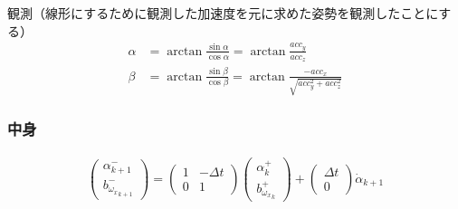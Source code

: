 観測（線形にするために観測した加速度を元に求めた姿勢を観測したことにする）
\begin{align}
  \alpha &= \arctan \frac{\sin \alpha}{\cos \alpha} = \arctan \frac{acc_y}{acc_z}\\
  \beta &= \arctan \frac{\sin \beta}{\cos \beta} = \arctan \frac{-acc_x}{\sqrt{acc_y^2 + acc^2_z}}
\end{align}

\subsubsection{中身}
\begin{align}
  \begin{pmatrix}
    \alpha_{k+1}^{-}\\
    b_{{\omega_x}_{k+1}}^{-}
  \end{pmatrix} =
  \begin{pmatrix}
    1 & -\Delta t\\
    0 & 1
  \end{pmatrix}
  \begin{pmatrix}
    \alpha_{k}^{+}\\
    b_{{\omega_x}_{k}}^{+}
  \end{pmatrix} +
  \begin{pmatrix}
    \Delta t\\
    0
  \end{pmatrix}
  \dot{\alpha}_{k+1}
\end{align}
